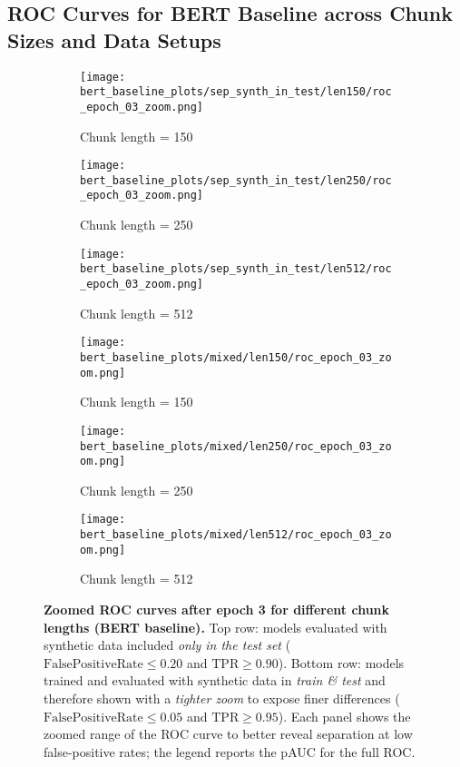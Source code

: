 
\subsection{ROC Curves for BERT Baseline across Chunk Sizes and Data Setups}


\begin{figure}[H]
  \centering

  \begin{subfigure}[t]{0.32\textwidth}
    \centering
    \texttt{[image: bert\_baseline\_plots/sep\_synth\_in\_test/len150/roc\_epoch\_03\_zoom.png]}
    \caption{Chunk length = 150}
  \end{subfigure}\hfill
  \begin{subfigure}[t]{0.32\textwidth}
    \centering
    \texttt{[image: bert\_baseline\_plots/sep\_synth\_in\_test/len250/roc\_epoch\_03\_zoom.png]}
    \caption{Chunk length = 250}
  \end{subfigure}\hfill
  \begin{subfigure}[t]{0.32\textwidth}
    \centering
    \texttt{[image: bert\_baseline\_plots/sep\_synth\_in\_test/len512/roc\_epoch\_03\_zoom.png]}
    \caption{Chunk length = 512}
  \end{subfigure}

  \vspace{0.45cm}
  \begin{subfigure}[t]{0.32\textwidth}
    \centering
    \texttt{[image: bert\_baseline\_plots/mixed/len150/roc\_epoch\_03\_zoom.png]}
    \caption{Chunk length = 150}
  \end{subfigure}\hfill
  \begin{subfigure}[t]{0.32\textwidth}
    \centering
    \texttt{[image: bert\_baseline\_plots/mixed/len250/roc\_epoch\_03\_zoom.png]}
    \caption{Chunk length = 250}
  \end{subfigure}\hfill
  \begin{subfigure}[t]{0.32\textwidth}
    \centering
    \texttt{[image: bert\_baseline\_plots/mixed/len512/roc\_epoch\_03\_zoom.png]}
    \caption{Chunk length = 512}
  \end{subfigure}

  \caption[Zoomed ROC curves after epoch 3 for different chunk lengths.]{\textbf{Zoomed ROC curves after epoch 3 for different chunk lengths (BERT baseline).}
  Top row: models evaluated with synthetic data included \emph{only in the test set} (\(\mathrm{False Positive Rate}\le 0.20\) and \(\mathrm{TPR}\ge 0.90\)). 
  Bottom row: models trained and evaluated with synthetic data in \emph{train \& test} and therefore shown with a \emph{tighter zoom} to expose finer differences (\(\mathrm{False Positive Rate}\le 0.05\) and \(\mathrm{TPR}\ge 0.95\)). 
  Each panel shows the zoomed range of the ROC curve to better reveal separation at low false-positive rates; the legend reports the pAUC for the full ROC.}
  \label{fig:roc_zoom_epoch3}
\end{figure}


